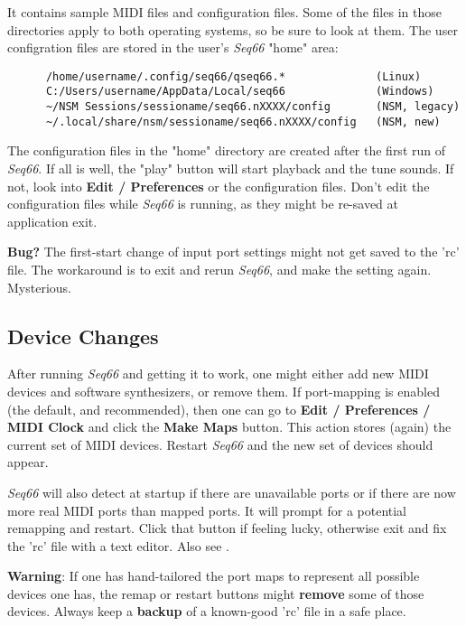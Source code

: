    It contains sample MIDI files and configuration files.
   Some of the files in those directories apply to both operating systems, so
   be sure to look at them.
   The user configration files are stored in the user's
   \textsl{Seq66} "home" area:

   \begin{verbatim}
      /home/username/.config/seq66/qseq66.*              (Linux)
      C:/Users/username/AppData/Local/seq66              (Windows)
      ~/NSM Sessions/sessioname/seq66.nXXXX/config       (NSM, legacy)
      ~/.local/share/nsm/sessioname/seq66.nXXXX/config   (NSM, new)
   \end{verbatim}

   The configuration files in the "home" directory
   are created after the first run of \textsl{Seq66}.
   If all is well, the "play" button will start playback and the tune sounds.
   If not, look into \textbf{Edit / Preferences} or the configuration files.
   Don't edit the configuration files while \textsl{Seq66} is running, as
   they might be re-saved at application exit.

   \textbf{Bug?}
      The first-start change of input port settings might not get saved
      to the 'rc' file. The workaround is to exit and rerun
      \textsl{Seq66}, and make the setting again.
      Mysterious.

\subsection{Device Changes}
\label{subsec:introduction_device_changes}

   After running \textsl{Seq66} and getting it to work, one might
   either add new MIDI devices and software synthesizers, or remove
   them.
   If port-mapping is enabled (the default, and recommended), then
   one can go to
   \textbf{Edit / Preferences / MIDI Clock} and
   click the \textbf{Make Maps} button.
   This action stores (again) the current set of MIDI devices.
   Restart \textsl{Seq66} and the new set of devices should appear.

   \textsl{Seq66} will also detect at startup if there are unavailable
   ports or if there are now more real MIDI ports than mapped ports.
   It will prompt for a potential remapping and restart.
   Click that button if feeling lucky, otherwise
   exit and fix the 'rc' file with a text editor.
   Also see .

   \textbf{Warning}:
   If one has hand-tailored the port maps to represent all possible devices one
   has, the remap or restart buttons might \textbf{remove}
   some of those devices.
   Always keep a \textbf{backup}
   of a known-good 'rc' file in a safe place.


